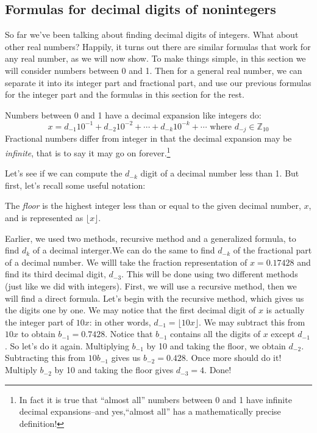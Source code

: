 \subsection{Formulas for  decimal digits of nonintegers}
So far we've been talking about finding decimal digits of integers. What about other real numbers? Happily, it turns out there are similar formulas that work for  any real number, as we will now show. To make things simple, in this section we will consider numbers between 0 and 1. Then for a general real number, we can separate it into its integer part and fractional part, and use our previous formulas for the integer part and the formulas in this section for the rest.

Numbers between 0 and 1 have a decimal expansion like integers do:
\begin{equation}
x=d_{-1}10^{-1}+d_{-2}10^{-2}+\cdots+d_{-k}10^{-k}+\cdots  \text{ where } d_{-j}\in \mathbb{Z}_{10}
\end{equation}
Fractional numbers differ from integer in that the decimal expansion may be \emph{infinite}, that is to say it may go on forever.\footnote{In fact it is true that ``almost all'' numbers between 0 and 1 have infinite decimal expansions--and yes,``almost all''  has a mathematically precise definition!}

Let's see if we can compute the $d_{-k}$ digit of a decimal number less than 1. But first, let's recall some useful notation:

\begin{defn}\label{floor} 
The \textit{floor} is the highest integer less than or equal to the given decimal number, $x$, and  is represented as $\lfloor x \rfloor$.
\end{defn}

Earlier, we used two methods, recursive method and a generalized formula, to find $d_k$ of a decimal interger.We can do the same to find $d_{-k}$ of the fractional part of a decimal number. We willl take the fraction representation of $x=0.17428$ and find its third decimal digit, $d_{-3}$. This will be done using two different methods (just like we did with integers). First, we will use a recursive method, then we will find a direct formula. Let's begin with the recursive method, which gives us the digits one by one. We may notice that the first decimal digit of $x$ is actually the integer part of $10x$: in other words, $d_{-1} = \lfloor 10x \rfloor$. We may subtract this from $10x$ to obtain $b_{-1} = 0.7428$.  Notice that $b_{-1}$ contains all the digits of $x$ except $d_{-1}$. So let's do it again.  Multiplying $b_{-1}$ by 10 and taking the floor, we obtain $d_{-2}$. Subtracting this from $10b_{-1}$ gives us $b_{-2} = 0.428$.  Once more should do it!  Multiply $b_{-2}$ by 10 and taking the floor gives $d_{-3} = 4$. Done!

